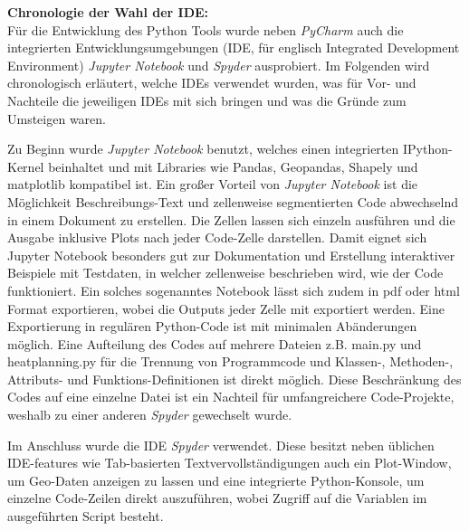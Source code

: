 		\textbf{Chronologie der Wahl der IDE:}\\
		Für die Entwicklung des Python Tools wurde neben \textit{PyCharm} auch die integrierten Entwicklungsumgebungen (IDE, für englisch Integrated Development Environment) \textit{Jupyter Notebook} und \textit{Spyder} ausprobiert. Im Folgenden wird chronologisch erläutert, welche IDEs verwendet wurden, was für Vor- und Nachteile die jeweiligen IDEs mit sich bringen und was die Gründe zum Umsteigen waren. 
			
		Zu Beginn wurde \textit{Jupyter Notebook} benutzt, welches einen integrierten IPython-Kernel beinhaltet und mit Libraries wie Pandas, Geopandas, Shapely und matplotlib kompatibel ist. Ein großer Vorteil von \textit{Jupyter Notebook} ist die Möglichkeit Beschreibungs-Text und zellenweise segmentierten Code abwechselnd in einem Dokument zu erstellen. Die Zellen lassen sich einzeln ausführen und die Ausgabe inklusive Plots nach jeder Code-Zelle darstellen. Damit eignet sich Jupyter Notebook besonders gut zur Dokumentation und Erstellung interaktiver Beispiele mit Testdaten, in welcher zellenweise beschrieben wird, wie der Code funktioniert. Ein solches sogenanntes Notebook lässt sich zudem in pdf oder html Format exportieren, wobei die Outputs jeder Zelle mit exportiert werden. Eine Exportierung in regulären Python-Code ist mit minimalen Abänderungen möglich. Eine Aufteilung des Codes auf mehrere Dateien z.B. main.py und heatplanning.py für die Trennung von Programmcode und Klassen-, Methoden-, Attributs- und Funktions-Definitionen ist direkt möglich. Diese Beschränkung des Codes auf eine einzelne Datei ist ein Nachteil für umfangreichere Code-Projekte, weshalb zu einer anderen \textit{Spyder} gewechselt wurde.
		
		Im Anschluss wurde die IDE \textit{Spyder} verwendet. Diese besitzt neben üblichen IDE-features wie Tab-basierten Textvervollständigungen auch ein Plot-Window, um Geo-Daten anzeigen zu lassen und eine integrierte Python-Konsole, um einzelne Code-Zeilen direkt auszuführen, wobei Zugriff auf die Variablen im ausgeführten Script besteht. 
		
